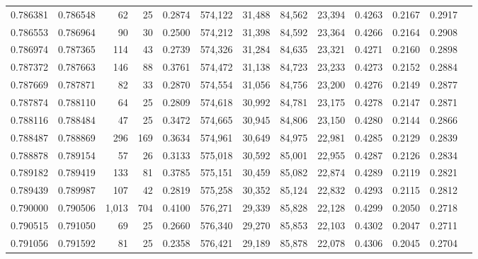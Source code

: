 \begin{tabular}{rrrrrrrrrrrrr}
0.786381 & 0.786548 &    62 &  25 &                                     0.2874 & 574,122 &  31,488 &  84,562 &  23,394 & 0.4263 & 0.2167 & 0.2917 \\
0.786553 & 0.786964 &    90 &  30 &                                     0.2500 & 574,212 &  31,398 &  84,592 &  23,364 & 0.4266 & 0.2164 & 0.2908 \\
0.786974 & 0.787365 &   114 &  43 &                                     0.2739 & 574,326 &  31,284 &  84,635 &  23,321 & 0.4271 & 0.2160 & 0.2898 \\
0.787372 & 0.787663 &   146 &  88 &                                     0.3761 & 574,472 &  31,138 &  84,723 &  23,233 & 0.4273 & 0.2152 & 0.2884 \\
0.787669 & 0.787871 &    82 &  33 &                                     0.2870 & 574,554 &  31,056 &  84,756 &  23,200 & 0.4276 & 0.2149 & 0.2877 \\
0.787874 & 0.788110 &    64 &  25 &                                     0.2809 & 574,618 &  30,992 &  84,781 &  23,175 & 0.4278 & 0.2147 & 0.2871 \\
0.788116 & 0.788484 &    47 &  25 &                                     0.3472 & 574,665 &  30,945 &  84,806 &  23,150 & 0.4280 & 0.2144 & 0.2866 \\
0.788487 & 0.788869 &   296 & 169 &                                     0.3634 & 574,961 &  30,649 &  84,975 &  22,981 & 0.4285 & 0.2129 & 0.2839 \\
0.788878 & 0.789154 &    57 &  26 &                                     0.3133 & 575,018 &  30,592 &  85,001 &  22,955 & 0.4287 & 0.2126 & 0.2834 \\
0.789182 & 0.789419 &   133 &  81 &                                     0.3785 & 575,151 &  30,459 &  85,082 &  22,874 & 0.4289 & 0.2119 & 0.2821 \\
0.789439 & 0.789987 &   107 &  42 &                                     0.2819 & 575,258 &  30,352 &  85,124 &  22,832 & 0.4293 & 0.2115 & 0.2812 \\
0.790000 & 0.790506 & 1,013 & 704 &                                     0.4100 & 576,271 &  29,339 &  85,828 &  22,128 & 0.4299 & 0.2050 & 0.2718 \\
0.790515 & 0.791050 &    69 &  25 &                                     0.2660 & 576,340 &  29,270 &  85,853 &  22,103 & 0.4302 & 0.2047 & 0.2711 \\
0.791056 & 0.791592 &    81 &  25 &                                     0.2358 & 576,421 &  29,189 &  85,878 &  22,078 & 0.4306 & 0.2045 & 0.2704 \\

\end{tabular}
